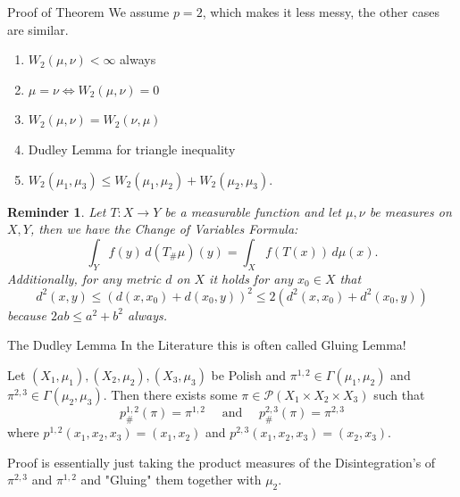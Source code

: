 \documentclass[10pt]{beamer}
\theoremstyle{reminder}
\newtheorem{reminder}{Reminder}
\begin{document}
\begin{frame}{Proof of Theorem}
    We assume $p = 2$, which makes it less messy, the other cases are similar.
    \bigbreak
    \begin{enumerate}
        \item $W_2(\mu, \nu) < \infty$ always
        \item $\mu = \nu \Leftrightarrow W_2(\mu,\nu) = 0$
        \item $W_2(\mu,\nu) = W_2(\nu, \mu)$
        \item Dudley Lemma for triangle inequality
        \item $W_2(\mu_1,\mu_3) \leq W_2(\mu_1,\mu_2) + W_2(\mu_2,\mu_3).$
    \end{enumerate}
    \begin{reminder}
        Let \( T: X \to Y \) be a measurable function and let $\mu,\nu$ be measures on $X,Y$, then we have the Change of Variables Formula:
        $$\int_Y f(y) \, d(T_{\#}\mu)(y) = \int_X f(T(x)) \, d\mu(x).$$
        Additionally, for any metric $d$ on $X$ it holds for any $x_0 \in X$ that $$d^2(x,y) \leq (d(x,x_0)+d(x_0,y))^2 \leq 2(d^2(x,x_0)+d^2(x_0,y))$$ because $2ab \leq a^2+b^2$ always.
    \end{reminder}
\end{frame}

\begin{frame}{The Dudley Lemma}
    In the Literature this is often called Gluing Lemma!

    \begin{lemma}
        Let $(X_1,\mu_1), (X_2,\mu_2),(X_3,\mu_3)$ be Polish and $\pi^{1,2} \in \Gamma(\mu_1,\mu_2)$ and $\pi^{2,3} \in \Gamma(\mu_2,\mu_3)$. 
        Then there exists some $\pi \in \mathcal{P}(X_1 \times X_2 \times X_3)$ such that $$p_{\#}^{1,2}(\pi) = \pi^{1,2} \quad \text{ and } \quad p_{\#}^{2,3}(\pi) = \pi^{2,3}$$ where $p^{1,2}(x_1,x_2,x_3) = (x_1,x_2)$ and $p^{2,3}(x_1,x_2,x_3) = (x_2,x_3).$ 
    \end{lemma}

    Proof is essentially just taking the product measures of the Disintegration's of $\pi^{2,3}$ and $\pi^{1,2}$ and "Gluing" them together with $\mu_2$. 
\end{frame}
\end{document}
